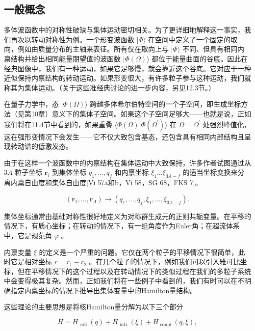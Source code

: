\subsection{一般概念}

多体波函数中的对称性破缺与集体运动密切相关。为了更详细地解释这一事实，我们再次以转动对称性为例。一个形变波函数 $|\Phi\rangle$
在空间中定义了一个固定的取向，例如由质量分布的主轴来表征。所有仅在取向上与 $|\Phi\rangle$ 不同、但具有相同内禀结构并给出相同能量期望值的波函数
$|\Phi(\Omega)\rangle$ 都位于能量曲面的谷底。因此在经典图像中，我们有一种运动，如果它足够慢，就会靠近这个谷底。它对应于一种近似保持内禀结构的转动运动。如果形变很大，有许多粒子参与这种运动，我们就称其为集体运动。（关于这些准经典讨论的进一步内容，另见12.3节。）

在量子力学中，态 $|\Phi\left(\Omega\right)\rangle$ 跨越多体希尔伯特空间的一个子空间，即生成坐标方法（见第10章）意义下的集体子空间。如果这个子空间足够大——也就是说，正如我们将在11.4节中看到的，如果重叠
$\langle\Phi\left(\Omega\right)|\Phi\left({\Omega}^{\prime}\right)\rangle$
在 $\Omega={\Omega}^{\prime}$ 处强烈峰值化，这在强形变情况下会发生——它不仅大致包含基态，还包含具有相同内部结构且呈现转动谱的低激发态。

由于在这样一个波函数中的内禀结构在集体运动中大致保持，许多作者试图通过从 ${3A}$ 粒子坐标 ${\boldsymbol{r}}_{i}$
到集体坐标 ${q}_{1},\ldots,{q}_{f}$ 和内禀坐标 ${\xi}_{1}\ldots{\xi}_{{3A}-f}$
的适当坐标变换来分离内禀自由度和集体自由度{[}Vi 57a和b，Vi 58，SG 68，FKS 7{]}。

\[
\left({{\boldsymbol{r}}_{1},\ldots,{\boldsymbol{r}}_{A}}\right)\rightarrow\left({{q}_{1},\ldots,{q}_{f},{\xi}_{1},\ldots,{\xi}_{{3A}-f}}\right).\tag{11.27}
\]

集体坐标通常由基础对称性很好地定义为对称群生成元的正则共轭变量。在平移的情况下，有质心坐标；在转动的情况下，有一组角度作为Euler角；在超流体系中，它是规范角
$\varphi$ 。

内禀变量 $\xi$ 的定义是一个严重的问题。它仅在两个粒子的平移情况下很简单，此时它是相对坐标 $r={r}_{1}-{r}_{2}$
。在几个粒子的情况下，例如我们可以引入雅可比坐标，但在平移情况下的这个过程以及在转动情况下的类似过程在我们的多粒子系统中会变得极其复杂。然而，正如我们将在一些例子中看到的，我们有时可以在不明确指定内禀坐标的情况下推导出集体变量中的Hamilton量结构。

这些理论的主要思想是将核Hamilton量分解为以下三个部分

\[
H={H}_{\text{ coll }}\left(q\right)+{H}_{\text{ intr }}\left(\xi\right)+{H}_{\text{ coupl }}\left({q,\xi}\right),\tag{11.28}
\]

